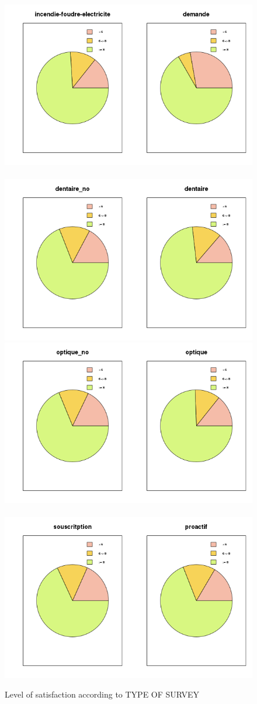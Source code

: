 \documentclass[a4paper, 11pt]{article}
\begin{document}
\begin{figure}[!ht]
                \includegraphics[width = 8.5 cm]{Remi/Level_of_satisfaction_according_to_TYPE_OF_SURVEY10.png}~
                \includegraphics[width = 8.5 cm]{Remi/Level_of_satisfaction_according_to_TYPE_OF_SURVEY12.png}
                \includegraphics[width = 8.5 cm]{Remi/Level_of_satisfaction_according_to_TYPE_OF_SURVEY14.png}~
                \includegraphics[width = 8.5 cm]{Remi/Level_of_satisfaction_according_to_TYPE_OF_SURVEY16.png}
                \caption{Level of satisfaction according to TYPE OF SURVEY}
                \label{fig:TYPE_OF_SURVEY2}
        \end{figure}
\end{document}
